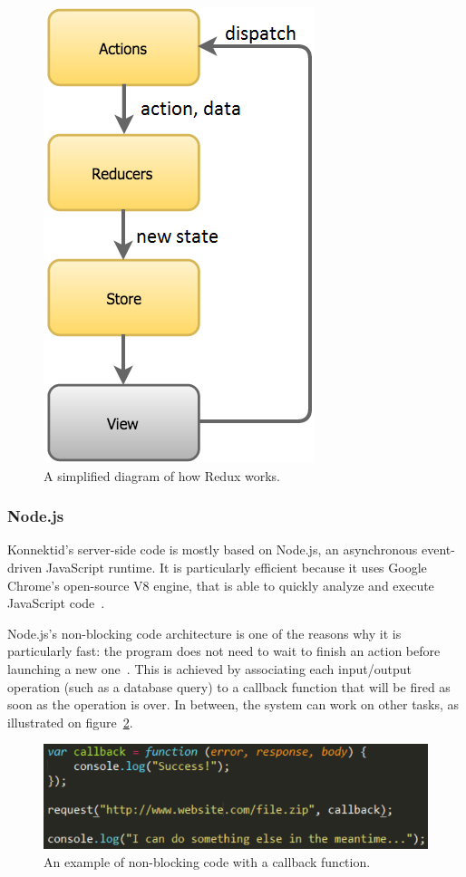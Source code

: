 \begin{figure}[H]
    \centering
    \includegraphics[scale=0.7]{figure/reduxFlow.png}
    \caption{A simplified diagram of how Redux works.}
    \label{fig:reduxSumup}
\end{figure}

\subsubsection{Node.js}
\label{sssec:node}

Konnektid's server-side code is mostly based on Node.js, an asynchronous event-driven JavaScript runtime. It is particularly efficient because it uses Google Chrome's open-source V8 engine, that is able to quickly analyze and execute JavaScript code~\cite{v8}.

Node.js's non-blocking code architecture is one of the reasons why it is particularly fast: the program does not need to wait to finish an action before launching a new one~\cite{node}. This is achieved by associating each input/output operation (such as a database query) to a callback function that will be fired as soon as the operation is over. In between, the system can work on other tasks, as illustrated on {\sc figure}~\ref{fig:callback}.

\begin{figure}[H]
    \centering
    \includegraphics[scale=0.8]{figure/callback.png}
    \caption{An example of non-blocking code with a callback function.}
    \label{fig:callback}
\end{figure}


